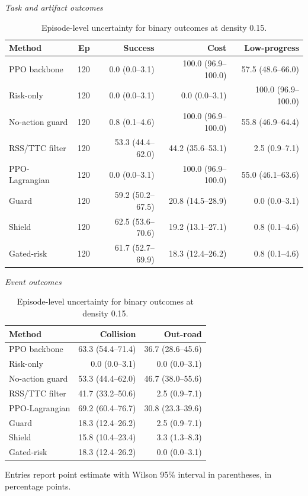 \begin{table}[!htbp]
\centering
\caption{Episode-level uncertainty for binary outcomes at density 0.15.}
\label{tab_ci_binary}
\scriptsize
\setlength{\tabcolsep}{3.2pt}
\renewcommand{\arraystretch}{1.08}
\textit{Task and artifact outcomes}\par
\begin{tabular}{@{}lrrrr@{}}
\toprule
Method & Ep & Success & Cost & Low-progress \\
\midrule
PPO backbone & 120 & 0.0 (0.0--3.1) & 100.0 (96.9--100.0) & 57.5 (48.6--66.0) \\
Risk-only & 120 & 0.0 (0.0--3.1) & 0.0 (0.0--3.1) & 100.0 (96.9--100.0) \\
No-action guard & 120 & 0.8 (0.1--4.6) & 100.0 (96.9--100.0) & 55.8 (46.9--64.4) \\
RSS/TTC filter & 120 & 53.3 (44.4--62.0) & 44.2 (35.6--53.1) & 2.5 (0.9--7.1) \\
PPO-Lagrangian & 120 & 0.0 (0.0--3.1) & 100.0 (96.9--100.0) & 55.0 (46.1--63.6) \\
Guard & 120 & 59.2 (50.2--67.5) & 20.8 (14.5--28.9) & 0.0 (0.0--3.1) \\
Shield & 120 & 62.5 (53.6--70.6) & 19.2 (13.1--27.1) & 0.8 (0.1--4.6) \\
Gated-risk & 120 & 61.7 (52.7--69.9) & 18.3 (12.4--26.2) & 0.8 (0.1--4.6) \\
\bottomrule
\end{tabular}
\vspace{3pt}
\textit{Event outcomes}\par
\begin{tabular}{@{}lrr@{}}
\toprule
Method & Collision & Out-road \\
\midrule
PPO backbone & 63.3 (54.4--71.4) & 36.7 (28.6--45.6) \\
Risk-only & 0.0 (0.0--3.1) & 0.0 (0.0--3.1) \\
No-action guard & 53.3 (44.4--62.0) & 46.7 (38.0--55.6) \\
RSS/TTC filter & 41.7 (33.2--50.6) & 2.5 (0.9--7.1) \\
PPO-Lagrangian & 69.2 (60.4--76.7) & 30.8 (23.3--39.6) \\
Guard & 18.3 (12.4--26.2) & 2.5 (0.9--7.1) \\
Shield & 15.8 (10.4--23.4) & 3.3 (1.3--8.3) \\
Gated-risk & 18.3 (12.4--26.2) & 0.0 (0.0--3.1) \\
\bottomrule
\end{tabular}
\begin{tablenotes}
\item Entries report point estimate with Wilson 95\% interval in parentheses, in percentage points.
\end{tablenotes}
\end{table}
